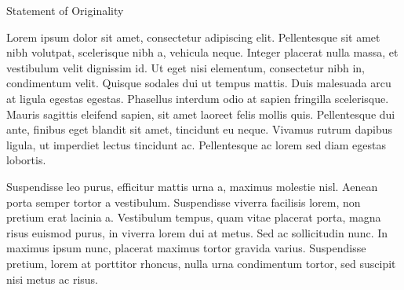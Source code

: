 \begin{center}
  \huge{Statement of Originality}
\end{center}

Lorem ipsum dolor sit amet, consectetur adipiscing elit. Pellentesque sit amet nibh volutpat, scelerisque nibh a, vehicula neque. Integer placerat nulla massa, et vestibulum velit dignissim id. Ut eget nisi elementum, consectetur nibh in, condimentum velit. Quisque sodales dui ut tempus mattis. Duis malesuada arcu at ligula egestas egestas. Phasellus interdum odio at sapien fringilla scelerisque. Mauris sagittis eleifend sapien, sit amet laoreet felis mollis quis. Pellentesque dui ante, finibus eget blandit sit amet, tincidunt eu neque. Vivamus rutrum dapibus ligula, ut imperdiet lectus tincidunt ac. Pellentesque ac lorem sed diam egestas lobortis.

Suspendisse leo purus, efficitur mattis urna a, maximus molestie nisl. Aenean porta semper tortor a vestibulum. Suspendisse viverra facilisis lorem, non pretium erat lacinia a. Vestibulum tempus, quam vitae placerat porta, magna risus euismod purus, in viverra lorem dui at metus. Sed ac sollicitudin nunc. In maximus ipsum nunc, placerat maximus tortor gravida varius. Suspendisse pretium, lorem at porttitor rhoncus, nulla urna condimentum tortor, sed suscipit nisi metus ac risus.

